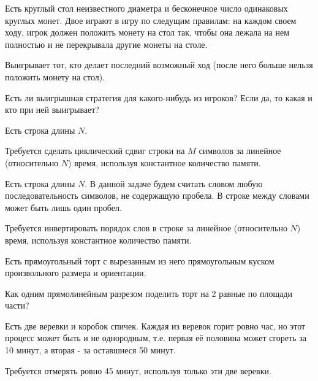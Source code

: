 \begin{problem}

Есть круглый стол неизвестного диаметра и бесконечное число одинаковых круглых монет. Двое играют в игру по следущим правилам: на каждом своем ходу, игрок должен положить монету на стол так, чтобы она лежала на нем полностью и не перекрывала другие монеты на столе.

Выигрывает тот, кто делает последний возможный ход (после него больше нельзя положить монету на стол). 

Есть ли выигрышная стратегия для какого-нибудь из игроков?
Если да, то какая и кто при ней выигрывает?

\end{problem}
\begin{problem}

Есть строка длины $N$.

Требуется сделать циклический сдвиг строки на $M$ символов за линейное (относительно $N$) время, используя константное количество памяти.

\end{problem}
\begin{problem}

Есть строка длины $N$. В данной задаче будем считать словом любую последовательность символов, не содержащую пробела. В строке между словами может быть лишь один пробел.

Требуется инвертировать порядок слов в строке за линейное (относительно $N$) время, используя константное количество памяти.

\end{problem}
\begin{problem}

Есть прямоугольный торт с вырезанным из него прямоугольным куском произвольного размера и ориентации.

Как одним прямолинейным разрезом поделить торт на 2 равные по площади части?

\end{problem}
\begin{problem}

Есть две веревки и коробок спичек. Каждая из веревок горит ровно час, но этот процесс может быть и не однородным, т.е. первая её половина может сгореть за 10 минут, а вторая - за оставшиеся 50 минут.

Требуется отмерять ровно 45 минут, используя только эти две веревки.

\end{problem}
